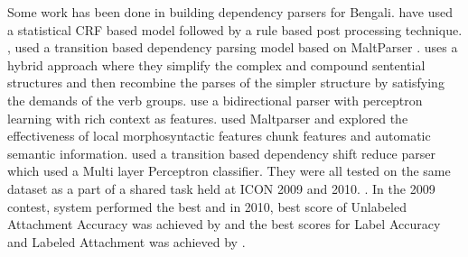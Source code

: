 \documentclass[11pt,letterpaper]{article}
\begin{document}
Some work has been done in building dependency parsers for Bengali. \citep{ghosh2009dependency} have used a statistical CRF based model followed by a rule based post processing technique. \citep{Nivre_parsingindian}, \citep{ambati_09} used a transition based dependency parsing model based on MaltParser \citep{Nivre05maltparser:a}. \citep{De_Dep_ben} uses a hybrid approach where they simplify the complex and compound sentential structures and then recombine the parses of the simpler structure by satisfying the demands of the verb groups. \citep{bidir_parser} use a bidirectional parser with perceptron learning with rich context as features. \citep{kosaraju_10} used Maltparser and explored the effectiveness of local morphosyntactic features chunk features and automatic semantic information. \citep{attardi_10} used a transition based dependency shift reduce parser which used a Multi layer Perceptron classifier. They were all tested on the same dataset as a part of a shared task held at ICON 2009 and 2010. \citep{husain_09, husain_10}. In the 2009 contest, \citep{ambati_09} system performed the best and in 2010, best score of Unlabeled Attachment Accuracy was achieved by \citep{attardi_10} and the best scores for Label Accuracy and Labeled Attachment was achieved by  \citep{kosaraju_10}.

\newpage




\label{lastpage}
\end{document}
